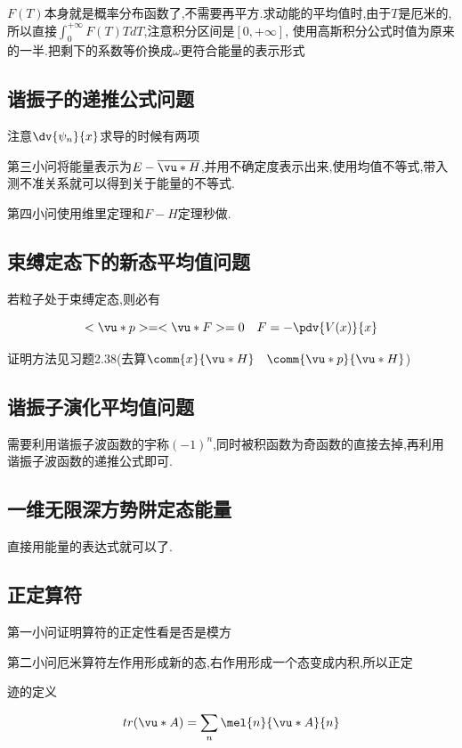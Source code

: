            $F(T)$本身就是概率分布函数了,不需要再平方.求动能的平均值时,由于$T$是厄米的,所以直接$\int_{0}^{+\infty} F(T) T dT $,注意积分区间是$[0,+\infty]$,
            使用高斯积分公式时值为原来的一半.把剩下的系数等价换成$\omega$更符合能量的表示形式

        \subsection{谐振子的递推公式问题}
            注意$\dv{\psi_{n}}{x}$求导的时候有两项

            第三小问将能量表示为$E - \overline{\vu*{H}} $,并用不确定度表示出来,使用均值不等式,带入测不准关系就可以得到关于能量的不等式.

            第四小问使用维里定理和$F-H$定理秒做.

        \subsection{束缚定态下的新态平均值问题}
            \begin{formal}
                
                若粒子处于束缚定态,则必有
                
                $$ <\vu*{p}> = <\vu*{F}> = 0 \quad F = -\pdv{V(x)}{x} $$

                证明方法见习题2.38(去算$\comm{x}{\vu*{H}} \quad \comm{\vu*{p}}{\vu*{H}}$)
            \end{formal}

        \subsection{谐振子演化平均值问题}
            需要利用谐振子波函数的宇称$(-1)^{n}$,同时被积函数为奇函数的直接去掉,再利用谐振子波函数的递推公式即可.


        \subsection{一维无限深方势阱定态能量}
            直接用能量的表达式就可以了.
        \subsection{正定算符}
            第一小问证明算符的正定性看是否是模方

            第二小问厄米算符左作用形成新的态,右作用形成一个态变成内积,所以正定

            \begin{formal}
                迹的定义

                $$ tr(\vu*{A}) = \sum_{n} \mel{n}{\vu*{A}}{n} $$
            \end{formal}
